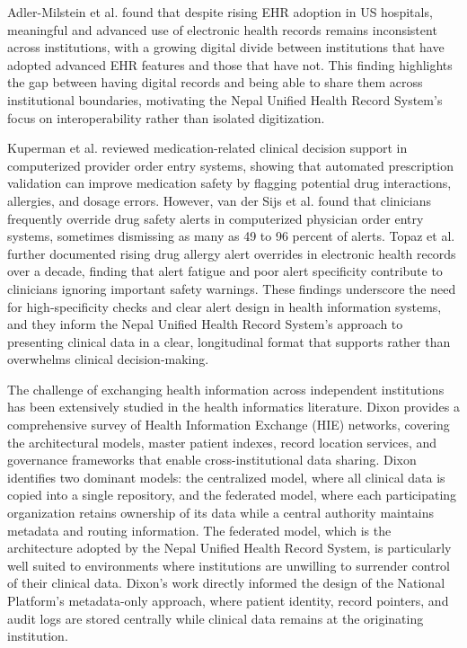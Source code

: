 \documentclass[12pt]{report}
\numberwithin{equation}{chapter}
\begin{document}
Adler-Milstein et al. \cite{adler} found that despite rising EHR adoption in US hospitals, meaningful and advanced use of electronic health records remains inconsistent across institutions, with a growing digital divide between institutions that have adopted advanced EHR features and those that have not. This finding highlights the gap between having digital records and being able to share them across institutional boundaries, motivating the Nepal Unified Health Record System's focus on interoperability rather than isolated digitization.

Kuperman et al. \cite{kuperman} reviewed medication-related clinical decision support in computerized provider order entry systems, showing that automated prescription validation can improve medication safety by flagging potential drug interactions, allergies, and dosage errors. However, van der Sijs et al. \cite{vandersijs} found that clinicians frequently override drug safety alerts in computerized physician order entry systems, sometimes dismissing as many as 49 to 96 percent of alerts. Topaz et al. \cite{topaz} further documented rising drug allergy alert overrides in electronic health records over a decade, finding that alert fatigue and poor alert specificity contribute to clinicians ignoring important safety warnings. These findings underscore the need for high-specificity checks and clear alert design in health information systems, and they inform the Nepal Unified Health Record System's approach to presenting clinical data in a clear, longitudinal format that supports rather than overwhelms clinical decision-making.

The challenge of exchanging health information across independent institutions has been extensively studied in the health informatics literature. Dixon \cite{dixon} provides a comprehensive survey of Health Information Exchange (HIE) networks, covering the architectural models, master patient indexes, record location services, and governance frameworks that enable cross-institutional data sharing. Dixon identifies two dominant models: the centralized model, where all clinical data is copied into a single repository, and the federated model, where each participating organization retains ownership of its data while a central authority maintains metadata and routing information. The federated model, which is the architecture adopted by the Nepal Unified Health Record System, is particularly well suited to environments where institutions are unwilling to surrender control of their clinical data. Dixon's work directly informed the design of the National Platform's metadata-only approach, where patient identity, record pointers, and audit logs are stored centrally while clinical data remains at the originating institution.
\end{document}
